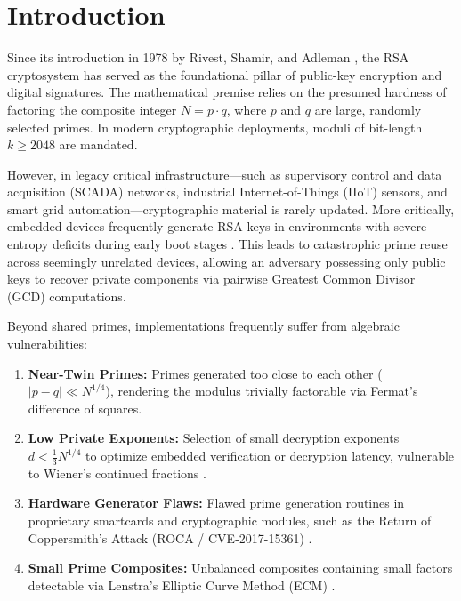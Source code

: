\documentclass[sigconf,nonacm]{acmart}
\begin{document}
\maketitle

\section{Introduction}
Since its introduction in 1978 by Rivest, Shamir, and Adleman \cite{rivest1978method}, the RSA cryptosystem has served as the foundational pillar of public-key encryption and digital signatures. The mathematical premise relies on the presumed hardness of factoring the composite integer $N = p \cdot q$, where $p$ and $q$ are large, randomly selected primes. In modern cryptographic deployments, moduli of bit-length $k \ge 2048$ are mandated.

However, in legacy critical infrastructure---such as supervisory control and data acquisition (SCADA) networks, industrial Internet-of-Things (IIoT) sensors, and smart grid automation---cryptographic material is rarely updated. More critically, embedded devices frequently generate RSA keys in environments with severe entropy deficits during early boot stages \cite{heninger2012mining, hastings2016weak}. This leads to catastrophic prime reuse across seemingly unrelated devices, allowing an adversary possessing only public keys to recover private components via pairwise Greatest Common Divisor (GCD) computations. 

Beyond shared primes, implementations frequently suffer from algebraic vulnerabilities:
\begin{enumerate}
    \item \textbf{Near-Twin Primes:} Primes generated too close to each other ($|p - q| \ll N^{1/4}$), rendering the modulus trivially factorable via Fermat's difference of squares.
    \item \textbf{Low Private Exponents:} Selection of small decryption exponents $d < \frac{1}{3} N^{1/4}$ to optimize embedded verification or decryption latency, vulnerable to Wiener's continued fractions \cite{wiener1990cryptanalysis}.
    \item \textbf{Hardware Generator Flaws:} Flawed prime generation routines in proprietary smartcards and cryptographic modules, such as the Return of Coppersmith's Attack (ROCA / CVE-2017-15361) \cite{nemec2017return}.
    \item \textbf{Small Prime Composites:} Unbalanced composites containing small factors detectable via Lenstra's Elliptic Curve Method (ECM) \cite{lenstra1987factoring}.
\end{enumerate}
\end{document}
